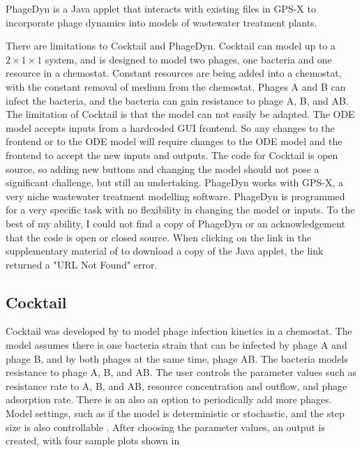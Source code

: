 PhageDyn \cite{krysiak-baltynSimulationPhageDynamics2017} is a Java applet that interacts with existing files in GPS-X \cite{AdvancedWastewaterModelling} to incorporate phage dynamics into models of wastewater treatment plants. 

There are limitations to Cocktail and PhageDyn. 
Cocktail can model up to a $2\times 1 \times 1$ system, and is designed to model two phages, one bacteria and one resource in a chemostat. 
Constant resources are being added into a chemostat, with the constant removal of medium from the chemostat. 
Phages A and B can infect the bacteria, and the bacteria can gain resistance to phage A, B, and AB. 
The limitation of Cocktail is that the model can not easily be adapted. 
The ODE model accepts inputs from a hardcoded GUI frontend. 
So any changes to the frontend or to the ODE model will require changes to the ODE model and the frontend to accept the new inputs and outputs. 
The code for Cocktail is open source, so adding new buttons and changing the model should not pose a significant challenge, but still an undertaking. \newline
PhageDyn works with GPS-X, a very niche wastewater treatment modelling software. 
PhageDyn is programmed for a very specific task with no flexibility in changing the model or inputs. 
To the best of my ability, I could not find a copy of PhageDyn or an acknowledgement that the code is open or closed source. 
When clicking on the link in the supplementary material of \citet{krysiak-baltynSimulationPhageDynamics2017} to download a copy of the Java applet, the link returned a "URL Not Found" error. 


\subsection{Cocktail}
Cocktail was developed by \citet{nilssonCocktailComputerProgram2022} to model phage infection kinetics in a chemostat. 
The model assumes there is one bacteria strain that can be infected by phage A and phage B, and by both phages at the same time, phage AB. 
The bacteria models resistance to phage A, B, and AB. 
The user controls the parameter values such as resistance rate to A, B, and AB, resource concentration and outflow, and phage adsorption rate. 
There is an also an option to periodically add more phages. 
Model settings, such as if the model is deterministic or stochastic, and the step size is also controllable \cite{nilssonCocktailComputerProgram2022}. 
After choosing the parameter values, an output is created, with four sample plots shown in 


